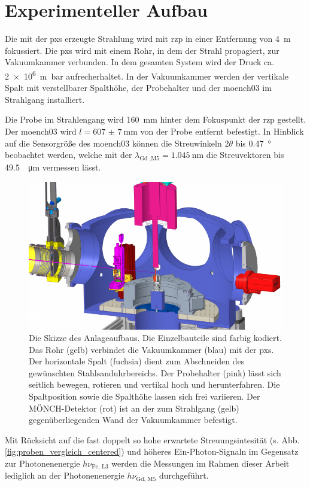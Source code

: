\chapter{Experimenteller Aufbau}
Die mit der \gls{pxs} erzeugte Strahlung wird mit \gls{rzp} in einer Entfernung von \SI{4}{\meter} fokussiert. Die \gls{pxs} wird mit einem Rohr, in dem der Strahl propagiert, zur Vakuumkammer verbunden. In dem gesamten System wird der Druck ca. \SI{2e6}{\meter\bar} aufrecherhaltet. In der Vakuumkammer werden der vertikale Spalt mit verstellbarer Spalthöhe, der Probehalter und der \gls{moench03} im Strahlgang installiert.

\noindent
Die Probe im Strahlengang wird \SI{160}{\milli\meter} hinter dem Fokuspunkt der \gls{rzp} gestellt. Der \gls{moench03} wird $l = \SI{607(7)}{\milli\meter}$ von der Probe entfernt befestigt. In Hinblick auf die Sensorgröße  des \gls{moench03} können die Streuwinkeln $2\theta$ bis \SI{0.47}{\degree} beobachtet werden, welche mit der $\lambda_\text{Gd ,M5} = \SI{1.045}{\nano\meter}$ die Streuvektoren bis \SI{49,5}{\per\micro\meter} vermessen lässt.
\begin{figure}[H]
    \centering
    \includegraphics{images/aufbau/aufbau_empty.pdf}
    \caption{Die Skizze des Anlageaufbaus. Die Einzelbauteile sind farbig kodiert. Das Rohr (gelb) verbindet die Vakuumkammer (blau) mit der \gls{pxs}. Der horizontale Spalt (fuchsia) dient zum Abschneiden des gewünschten Stahlsanduhrbereichs. Der Probehalter (pink) lässt sich seitlich bewegen, rotieren und vertikal hoch und herunterfahren. Die Spaltposition sowie die Spalthöhe lassen sich frei variieren. Der MÖNCH-Detektor (rot) ist an der zum Strahlgang (gelb) gegenüberliegenden Wand der Vakuumkammer befestigt.}
    \label{fig:anlage}
\end{figure}
\noindent
Mit Rücksicht auf die fast doppelt so hohe erwartete Streuungsintesität (s. Abb. \ref{fig:proben_vergleich_centered}) und höheres Ein-Photon-Signaln im Gegensatz zur Photonenenergie $h\nu_\text{Fe, L3}$ werden die Messungen im Rahmen dieser Arbeit lediglich an der Photonenenergie $h\nu_\text{Gd, M5}$ durchgeführt.

